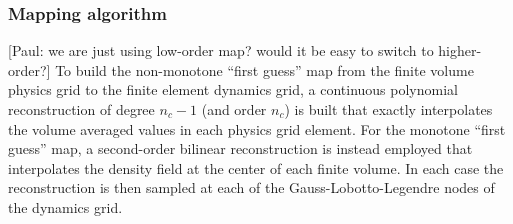 \subsubsection{Mapping algorithm} [Paul: we are just using low-order map? would it be easy to switch to higher-order?] To build the non-monotone ``first guess'' map from the finite volume physics grid to the finite element dynamics grid, a continuous polynomial reconstruction of degree $n_c-1$ (and order $n_c$) is built that exactly interpolates the volume averaged values in each physics grid element.  For the monotone ``first guess'' map, a second-order bilinear reconstruction is instead employed that interpolates the density field at the center of each finite volume.  In each case the reconstruction is then sampled at each of the Gauss-Lobotto-Legendre nodes of the dynamics grid.
